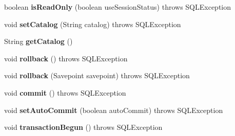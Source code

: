 \begin{DoxyCompactItemize}
boolean {\bfseries is\+Read\+Only} (boolean use\+Session\+Status)  throws S\+Q\+L\+Exception 
\item 
\mbox{\label{classcom_1_1mysql_1_1fabric_1_1jdbc_1_1_fabric_my_s_q_l_connection_proxy_ac729df86c5b41dfb43aefa8392bfef05}} 
void {\bfseries set\+Catalog} (String catalog)  throws S\+Q\+L\+Exception 
\item 
\mbox{\label{classcom_1_1mysql_1_1fabric_1_1jdbc_1_1_fabric_my_s_q_l_connection_proxy_ad4cfef26f02af042aabdaed82af7af0f}} 
String {\bfseries get\+Catalog} ()
\item 
\mbox{\label{classcom_1_1mysql_1_1fabric_1_1jdbc_1_1_fabric_my_s_q_l_connection_proxy_ae112b3f90845e4c9c6bf121521101a46}} 
void {\bfseries rollback} ()  throws S\+Q\+L\+Exception 
\item 
\mbox{\label{classcom_1_1mysql_1_1fabric_1_1jdbc_1_1_fabric_my_s_q_l_connection_proxy_adc5379e6ef55046cf8e8b11b34629a16}} 
void {\bfseries rollback} (Savepoint savepoint)  throws S\+Q\+L\+Exception 
\item 
\mbox{\label{classcom_1_1mysql_1_1fabric_1_1jdbc_1_1_fabric_my_s_q_l_connection_proxy_a87162dda9ae8d65c32722010aa6feb1f}} 
void {\bfseries commit} ()  throws S\+Q\+L\+Exception 
\item 
\mbox{\label{classcom_1_1mysql_1_1fabric_1_1jdbc_1_1_fabric_my_s_q_l_connection_proxy_a247c0a5c41a84739a44ae4122603f224}} 
void {\bfseries set\+Auto\+Commit} (boolean auto\+Commit)  throws S\+Q\+L\+Exception 
\item 
\mbox{\label{classcom_1_1mysql_1_1fabric_1_1jdbc_1_1_fabric_my_s_q_l_connection_proxy_a2e684d2042a2b93a173e8adfb804e311}} 
void {\bfseries transaction\+Begun} ()  throws S\+Q\+L\+Exception 
\item 

\end{DoxyCompactItemize}
